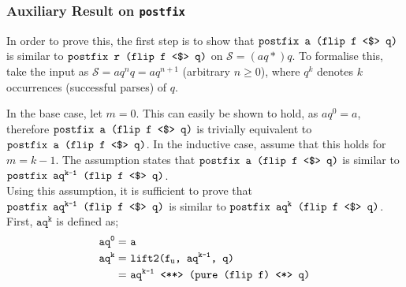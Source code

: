 \subsubsection*{Auxiliary Result on \texttt{postfix}}

In order to prove this, the first step is to show that $\texttt{postfix a (flip f \fmap q)}$ is similar to $\texttt{postfix r (flip f \fmap q)}$ on $\mathcal{S} = (aq*)q$.
To formalise this, take the input as $\mathcal{S} = aq^nq = aq^{n + 1}$ (arbitrary $n \geq 0$), where $q^k$ denotes $k$ occurrences (successful parses) of $q$.

In the base case, let $m = 0$.
This can easily be shown to hold, as $aq^0 = a$, therefore $\texttt{postfix a (flip f \fmap q)}$ is trivially equivalent to $\texttt{postfix a (flip f \fmap q)}$.
In the inductive case, assume that this holds for $m = k - 1$.
The assumption states that $\texttt{postfix a (flip f \fmap q)}$ is similar to $\texttt{postfix aq}^\texttt{k-1}\texttt{ (flip f \fmap q)}$. \\
Using this assumption, it is sufficient to prove that $\texttt{postfix aq}^\texttt{k-1}\texttt{ (flip f \fmap q)}$ is similar to $\texttt{postfix aq}^\texttt{k}\texttt{ (flip f \fmap q)}$.
First, $\texttt{aq}^\texttt{k}$ is defined as;
\begin{align*}
    \texttt{aq}^\texttt{0} =\ & \texttt{a} \\
    \texttt{aq}^\texttt{k} =\ & \texttt{lift2(f}_\texttt{u}\texttt{, aq}^\texttt{k-1}\texttt{, q)} \\
    =\ & \texttt{aq}^\texttt{k-1}\texttt{ \pa (pure (flip f) \ap q)}
\end{align*}

